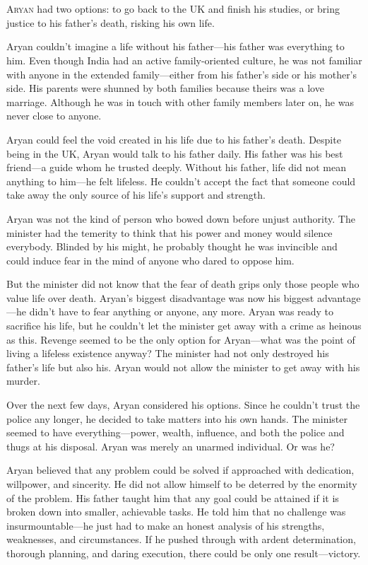 \chapter{}

\lettrine{A}{ryan} had two options: to go back to the UK and finish his studies, or
bring justice to his father's death, risking his own life.

Aryan couldn't imagine a life without his father—his father was everything to
him. Even though India had an active family-oriented culture, he was not
familiar with anyone in the extended family—either from his father's side or
his mother's side. His parents were shunned by both families because theirs was
a love marriage. Although he was in touch with other family members later on, he
was never close to anyone.

Aryan could feel the void created in his life due to his father's death. Despite
being in the UK, Aryan would talk to his father daily. His father was his best friend—a
guide whom he trusted deeply. Without his father, life did not mean anything to
him—he felt lifeless. He couldn't accept the fact that someone could take away
the only source of his life's support and strength.

Aryan was not the kind of person who bowed down before unjust authority. The
minister had the temerity to think that his power and money would silence
everybody. Blinded by his might, he probably thought he was invincible and could
induce fear in the mind of anyone who dared to oppose him.

But the minister did not know that the fear of death grips only those people who
value life over death. Aryan's biggest disadvantage was now his biggest
advantage—he didn't have to fear anything or anyone, any more. Aryan was ready
to sacrifice his life, but he couldn't let the minister get away with a crime as
heinous as this. Revenge seemed to be the only option for Aryan—what was the
point of living a lifeless existence anyway? The minister had not only destroyed
his father's life but also his. Aryan would not allow the minister to get away
with his murder.

Over the next few days, Aryan considered his options. Since he couldn't trust the
police any longer, he decided to take matters into his own hands. The minister seemed to
have everything—power, wealth, influence, and both the police and thugs at his disposal.
Aryan was merely an unarmed individual. Or was he?

Aryan believed that any problem could be solved if approached with dedication,
willpower, and sincerity. He did not allow himself to be deterred by the
enormity of the problem. His father taught him that any goal could be attained if
it is broken down into smaller, achievable tasks. He told him that no
challenge was insurmountable—he just had to make an honest analysis of his
strengths, weaknesses, and circumstances. If he pushed through with ardent
determination, thorough planning, and daring execution, there could be only one
result—victory.


